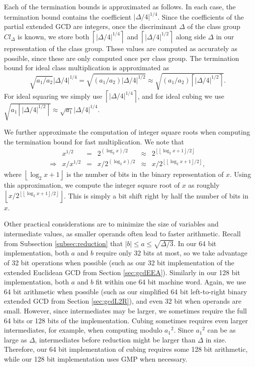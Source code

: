 \documentclass{ucalgthes1}
\theoremstyle{definition}
\newcommand{\floor}[1]{\left\lfloor #1 \right\rfloor}
\newcommand{\ceil}[1]{\left\lceil #1 \right\rceil}
\begin{document}

Each of the termination bounds is approximated as follows.  In each case, the termination bound contains the coefficient $|\Delta/4|^{1/4}$.  Since the coefficients of the partial extended GCD are integers, once the discriminant $\Delta$ of the class group $Cl_\Delta$ is known, we store both $\ceil{|\Delta/4|^{1/4}}$ and $\ceil{|\Delta/4|^{1/2}}$ along side $\Delta$ in our representation of the class group.  These values are computed as accurately as possible, since these are only computed once per class group.  The termination bound for ideal class multiplication is approximated as
\[
\sqrt{a_1/a_2}|\Delta/4|^{1/4} = \sqrt{(a_1/a_2) |\Delta/4|^{1/2}} \approx \sqrt{(a_1/a_2) \ceil{|\Delta/4|^{1/2}}}.
\]
For ideal squaring we simply use $\ceil{|\Delta/4|^{1/4}}$, and for ideal cubing we use $\sqrt{a_1\ceil{|\Delta/4|^{1/2}}} \approx \sqrt{a_1}|\Delta/4|^{1/4}$.  

We further approximate the computation of integer square roots when computing the termination bound for fast multiplication.  We note that 
\begin{equation*}
\begin{array}{rrlrlr}
	& x^{1/2} &=& 2^{(\log_2x)/2} &\approx& 2^{\floor{\floor{\log_2x+1}/2}} \\
	\Rightarrow & x / x^{1/2} &=& x / 2^{(\log_2x)/2} &\approx& x / 2^{\floor{\floor{\log_2x+1}/2}},
\end{array}
\end{equation*}
where $\floor{\log_2x+1}$ is the number of bits in the binary representation of $x$.  Using this approximation, we compute the integer square root of $x$ as roughly $\floor{x / 2^{\floor{\floor{\log_2x+1}/2}}}$.  This is simply a bit shift right by half the number of bits in $x$.

Other practical considerations are to minimize the size of variables and intermediate values, as smaller operands often lead to faster arithmetic.  Recall from Subsection \ref{subsec:reduction} that $|b| \le a \le \sqrt{\Delta/3}$.  In our 64 bit implementation, both $a$ and $b$ require only 32 bits at most, so we take advantage of 32 bit operations when possible (such as our 32 bit implementation of the extended Euclidean GCD from Section \ref{sec:gcdEEA}).  Similarly in our 128 bit implementation, both $a$ and $b$ fit within one 64 bit machine word.  Again, we use 64 bit arithmetic when possible (such as our simplified 64 bit left-to-right binary extended GCD from Section \ref{sec:gcdL2R}), and even 32 bit when operands are small.  However, since intermediates may be larger, we sometimes require the full 64 bits or 128 bits of the implementation.  Cubing sometimes requires even larger intermediates, for example, when computing modulo ${a_1}^2$.  Since ${a_1}^2$ can be as large as $\Delta$, intermediates before reduction might be larger than $\Delta$ in size.  Therefore, our 64 bit implementation of cubing requires some 128 bit arithmetic, while our 128 bit implementation uses GMP when necessary.
\end{document}
